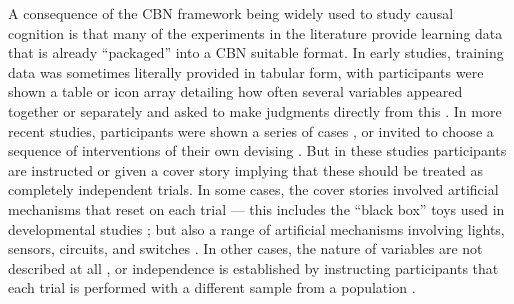 \documentclass{cambridge7A}%
\begin{document}
A consequence of the CBN framework being widely used to study causal cognition is that many of the experiments in the literature provide learning data that is already ``packaged'' into a CBN suitable format.  %
In early studies, training data was sometimes literally provided in tabular form, with participants were shown a table or icon array detailing how often several variables appeared together or separately and asked to make judgments directly from this \citep{cheng1990probabilistic}.   In more recent studies, participants were shown a series of cases \citep{gopnik2000detecting,sobel2004children,deverett2012learning,lagnado2002learning},  or invited to choose a sequence of interventions of their own devising \citep{coenen2015strategies,bramley2015fcs,bramley2017neurath}.  But in these studies participants are instructed or given a cover story implying that these should be treated as completely independent trials.   %
In some cases, the cover stories involved artificial mechanisms that reset on each trial --- this includes the ``black box'' toys used in developmental studies \citep{mccormack2016children,gopnik2007causal,coenen2017beliefs}; but also a range of artificial mechanisms involving lights, sensors, circuits, and switches \citep{waldmann2000competition,sobel2006importance,coenen2017beliefs}.  In other cases, the nature of variables are not described at all \citep{bramley2015fcs,bramley2017neurath,rehder2005feature}, or independence is established by instructing participants that each trial is performed with a different sample from a population %
\citep{rehder2003causal, rottman2012causal, rehder2017failures}.
\end{document}

